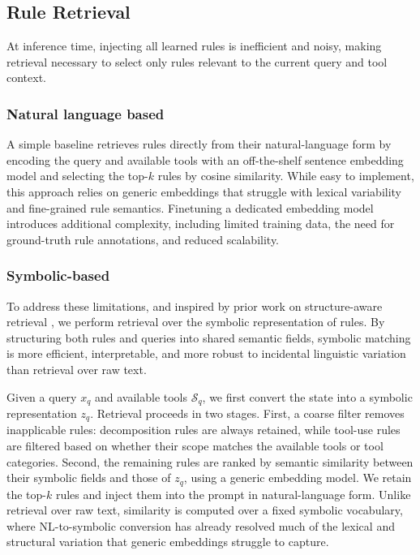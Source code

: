 \subsection{Rule Retrieval}
\label{sec:retrieval}

At inference time, injecting all learned rules is inefficient and noisy, making retrieval
necessary to select only rules relevant to the current query and tool context.


\subsubsection{Natural language based}

A simple baseline retrieves rules directly from their natural-language form by encoding the
query and available tools with an off-the-shelf sentence embedding model and selecting the
top-$k$ rules by cosine similarity. While easy to implement, this approach relies on generic
embeddings that struggle with lexical variability and fine-grained rule semantics. Finetuning
a dedicated embedding model introduces additional complexity, including limited training
data, the need for ground-truth rule annotations, and reduced scalability.

\subsubsection{Symbolic-based}

To address these limitations, and inspired by prior work on structure-aware retrieval
\citep{munikoti2023atlantic,li2023santa}, we perform retrieval over the symbolic
representation of rules. By structuring both rules and queries into shared semantic fields,
symbolic matching is more efficient, interpretable, and more robust to incidental linguistic
variation than retrieval over raw text.

Given a query \( x_q \) and available tools \( \mathcal{S}_q \), we first convert the state into a symbolic representation \( z_q \). Retrieval proceeds in two stages. First, a coarse filter removes inapplicable rules: decomposition rules are always retained, while tool-use rules are filtered based on whether their scope matches the available tools or tool categories. Second, the remaining rules are ranked by semantic similarity between their symbolic fields and those of \( z_q \), using a generic embedding model. We retain the top-$k$ rules and inject them into the prompt in natural-language form. Unlike retrieval over raw text, similarity is computed over a fixed symbolic vocabulary, where NL-to-symbolic conversion has already resolved much of the lexical and structural variation that generic embeddings struggle to capture.